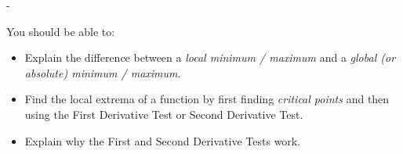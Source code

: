 \documentclass{article}
\makeatletter
\newlength{\tipmargin}
\renewenvironment{framed}{
  \setlength{\tipmargin}{\textwidth-\linewidth}
  \advance\@totalleftmargin-\tipmargin
  \def\FrameCommand{\hspace{\tipmargin}\fbox}%
  \advance\linewidth\tipmargin
  \MakeFramed {\advance\hsize-\width \FrameRestore}%
}
{\endMakeFramed}
\makeatother
\begin{document}

\begin{problemonly}
  \begin{framed}

You should be able to:
    \begin{itemize}[topsep=0pt,partopsep=0pt,parsep=8pt,itemsep=0pt]

    \item Explain the difference between a \emph{local minimum / maximum} and a \emph{global (or absolute) minimum / maximum}.

    \item Find the local extrema of a function by first finding \emph{critical points} and then using the First Derivative Test or Second Derivative Test.

    \item Explain why the First and Second Derivative Tests work.

    \end{itemize}
  \end{framed}
\end{problemonly}
\end{document}
